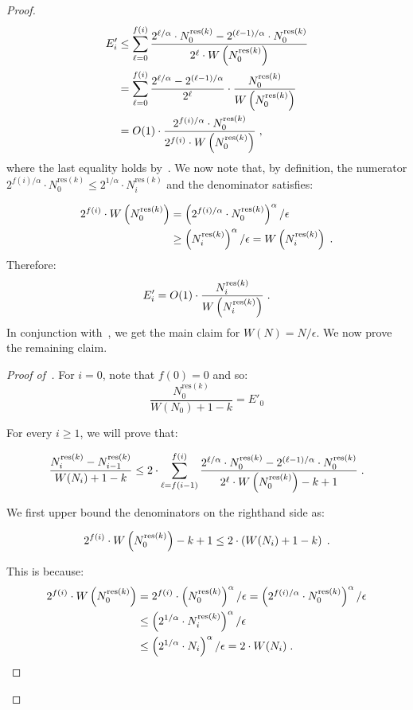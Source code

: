 \documentclass[sigconf]{acmart}
\begin{document}
\begin{proof}
\begin{align*}
E'_i &\leq  \sum_{\ell=0}^{f(i)} \frac{2^{\ell/\alpha} \cdot N^{\text{res}(k)}_0 - 2^{(\ell-1)/\alpha} \cdot N^{\text{res}(k)}_0}{2^{\ell} \cdot W\left(N^{\text{res}(k)}_0 \right)} \\
&=  \sum_{\ell=0}^{f(i)} \frac{2^{\ell/\alpha} - 2^{(\ell-1)/\alpha} }{2^{\ell}}  \cdot \frac{N^{\text{res}(k)}_0}{W\left(N^{\text{res}(k)}_0 \right)}\\
&= O(1) \cdot  \frac{2^{f(i)/\alpha} \cdot N^{\text{res}(k)}_0}{2^{f(i)} \cdot W\left(N^{\text{res}(k)}_0 \right)} \;,\\
\end{align*}
where the last equality holds by~. We now note that, by definition, the numerator $2^{f(i)/\alpha} \cdot N^{\text{res}(k)}_0 \leq 2^{1/\alpha} \cdot N^{\text{res}(k)}_i $ and the denominator satisfies:

\begin{align*}
2^{f(i)} \cdot W\left(N^{\text{res}(k)}_0 \right) &= 	\left(2^{f(i)/\alpha} \cdot N^{\text{res}(k)}_0\right)^\alpha /\epsilon \\
&\geq \left(N^{\text{res}(k)}_i\right)^\alpha /\epsilon=W\left(N^{\text{res}(k)}_i\right) \;.
\end{align*}
Therefore:
$$ E'_i = O(1) \cdot \frac{ N^{\text{res}(k)}_i}{ W\left(N^{\text{res}(k)}_i \right)}  \;.$$
In conjunction with~, we get the main claim for $W(N)=N/\epsilon$. We now prove the remaining claim.
\begin{proof}[Proof of~]
For $i=0$, note that $f(0)=0$ and so:
$$ \frac{N^{\text{res}(k)}_0}{W(N_0)+1-k} = E'_0$$

\noindent
For every $i \geq 1$, we will prove that:

$$ \frac{N^{\text{res}(k)}_{i}- N^{\text{res}(k)}_{i-1}}{W(N_i)+1-k} \leq 2 \cdot  \sum_{\ell=f(i-1)}^{f(i)} \frac{2^{\ell/\alpha} \cdot N^{\text{res}(k)}_0 - 2^{(\ell-1)/\alpha} \cdot N^{\text{res}(k)}_0}{2^{\ell} \cdot W\left(N^{\text{res}(k)}_0 \right)-k+1} \;.$$

\noindent
We first upper bound the denominators on the righthand side as:

$$2^{f(i)} \cdot W\left(N^{\text{res}(k)}_0 \right)-k+1 \leq 2 \cdot \left({W(N_i)+1-k}\right) \;.$$

\noindent
This is because:
\begin{align*}
2^{f(i)} \cdot W\left(N^{\text{res}(k)}_0 \right) &=	2^{f(i)} \cdot \left(N^{\text{res}(k)}_0 \right)^{\alpha} /\epsilon = \left(2^{f(i)/\alpha} \cdot N^{\text{res}(k)}_0\right)^\alpha /\epsilon\\
&\leq \left(2^{1/\alpha} \cdot N^{\text{res}(k)}_i\right)^\alpha /\epsilon\\
&\leq \left(2^{1/\alpha} \cdot N_i\right)^\alpha /\epsilon= 2  \cdot W(N_i) \;.
\end{align*}


\end{proof}
\end{proof}
\end{document}

